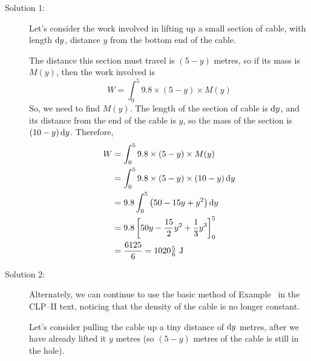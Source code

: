 \begin{solution}
\begin{description}
\item[Solution 1:]
Let's consider the work involved in lifting up a small section of cable, with length $\mathrm{d}y$, distance $y$ from the bottom end of the cable.

\begin{center}
\end{center}



 The distance this section must travel is $(5-y)$ metres, so if its mass is $M(y)$, then the work involved is
\[W = \int_0^5 9.8 \times (5-y)\times M(y)\]
So, we need to find $M(y)$. The length of the section of cable is $\mathrm{d}y$, and its distance from the end of the cable is $y$, so the mass of the section is $(10-y)\,\mathrm{d}y$. Therefore,
\begin{align*}
W &= \int_0^5 9.8 \times (5-y)\times M(y)\\
&= \int_0^5 9.8 \times (5-y)\times (10-y)\,\mathrm{d}y\\
&=9.8\int_0^5 \big(50-15y+y^2\big)\,\mathrm{d}y\\
&=9.8\left[50y-\frac{15}{2}y^2+\frac{1}{3}y^3\right]_0^5\\
&=\frac{6125}{6} = 1020\tfrac{5}{6}\ \text{J}
\end{align*}
\item[Solution 2:]
Alternately, we can continue to use the basic method of Example~ in the CLP--II text, noticing that the density of the cable is no longer constant.

Let's consider pulling the cable up a tiny distance of $\mathrm{d}y$ metres, after we have already lifted it $y$ metres (so  $(5-y)$ metres of the cable is still in the hole).


\end{description}
\end{solution}
